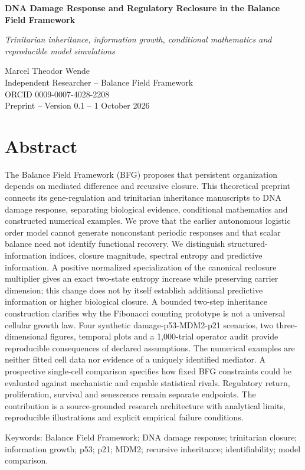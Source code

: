 \documentclass[11pt,a4paper]{article}
\begin{document}
{\LARGE\bfseries DNA Damage Response and Regulatory Reclosure in the Balance Field Framework\par}
\medskip
{\itshape Trinitarian inheritance, information growth, conditional mathematics and reproducible model simulations\par}
\medskip
Marcel Theodor Wende\\Independent Researcher -- Balance Field Framework\\ORCID 0009-0007-4028-2208\\Preprint -- Version 0.1 -- 1 October 2026
\medskip
\section*{Abstract}
The Balance Field Framework (BFG) proposes that persistent organization depends on mediated difference and recursive closure. This theoretical preprint connects its gene-regulation and trinitarian inheritance manuscripts to DNA damage response, separating biological evidence, conditional mathematics and constructed numerical examples. We prove that the earlier autonomous logistic order model cannot generate nonconstant periodic responses and that scalar balance need not identify functional recovery. We distinguish structured-information indices, closure magnitude, spectral entropy and predictive information. A positive normalized specialization of the canonical reclosure multiplier gives an exact two-state entropy increase while preserving carrier dimension; this change does not by itself establish additional predictive information or higher biological closure. A bounded two-step inheritance construction clarifies why the Fibonacci counting prototype is not a universal cellular growth law. Four synthetic damage-p53-MDM2-p21 scenarios, two three-dimensional figures, temporal plots and a 1,000-trial operator audit provide reproducible consequences of declared assumptions. The numerical examples are neither fitted cell data nor evidence of a uniquely identified mediator. A prospective single-cell comparison specifies how fixed BFG constraints could be evaluated against mechanistic and capable statistical rivals. Regulatory return, proliferation, survival and senescence remain separate endpoints. The contribution is a source-grounded research architecture with analytical limits, reproducible illustrations and explicit empirical failure conditions.

Keywords: Balance Field Framework; DNA damage response; trinitarian closure; information growth; p53; p21; MDM2; recursive inheritance; identifiability; model comparison.
\end{document}
